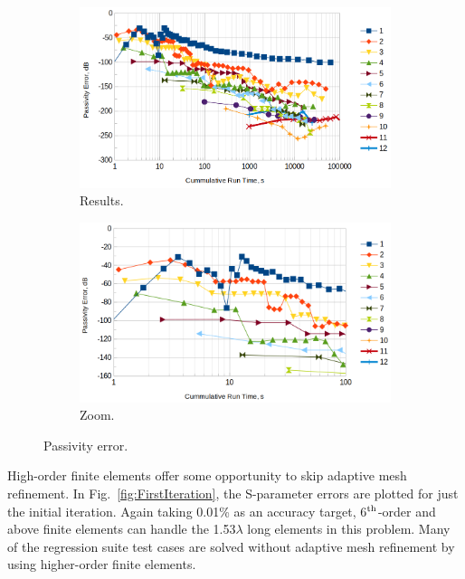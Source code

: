 \documentclass[titlepage]{article}
\renewcommand\_{\textunderscore\linebreak[1]}
\begin{document}
\begin{figure}[H]
  \centering
  \begin{subfigure}[t]{0.49\textwidth}
     \includegraphics[width=1\linewidth]{../regression/OpenParEM3D/WR90/straight_study/screenshots/PassivityError}
     \caption{Results.}
  \end{subfigure}
  \begin{subfigure}[t]{0.49\textwidth}
     \includegraphics[width=1\linewidth]{../regression/OpenParEM3D/WR90/straight_study/screenshots/PassivityErrorZoom}
     \caption{Zoom.}
  \end{subfigure}
  \caption{Passivity error.}
  \label{fig:PassivityError}
\end{figure}

High-order finite elements offer some opportunity to skip adaptive mesh refinement.  In Fig.~\ref{fig:FirstIteration}, the S-parameter errors are plotted for just the initial iteration.  Again taking 0.01\% as an accuracy target, 6$^{\textnormal{th}}$-order and above finite elements can handle the 1.53$\lambda$ long elements in this problem.  Many of the regression suite test cases are solved without adaptive mesh refinement by using higher-order finite elements.
\end{document}
